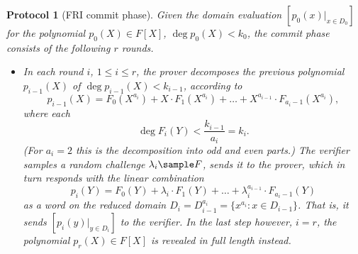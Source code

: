 \documentclass[11pt,article,oneside]{memoir}
\newtheorem{protocol}[]{Protocol}
\theoremstyle{definition}
\theoremstyle{remark}
\begin{document}
\begin{protocol}[FRI commit phase]
Given the domain evaluation $[p_0(x)|_{x\in D_0}]$ for the polynomial $p_0(X)\in F[X]$, $\deg p_0(X) < k_0$, the commit phase consists of the following $r$ rounds.
\begin{itemize}
\item
In each round $i$, $1\leq i\leq r$, the prover decomposes the previous polynomial $p_{i-1}(X)$ of $\deg p_{i-1}(X) < k_{i-1}$,  
according to
\begin{equation}
\label{e:FRIdecomposition}
p_{i-1}(X) = F_0(X^{a_i})+ X\cdot F_1(X^{a_i})+  \ldots +X^{a_{i-1}} \cdot F_{a_i-1}(X^{a_i}),
\end{equation}
where each 
\[
\deg F_i(Y) <  \frac{k_{i-1}}{a_i} = k_i.
\] 
(For $a_i=2$ this is the decomposition into odd and even parts.)
The verifier samples a random challenge $\lambda_i\sample F$, sends it to the prover, which in turn responds with the linear combination
\begin{equation*}
p_i(Y)=F_0(Y)+ \lambda_i \cdot F_1(Y)+  \ldots + \lambda_i^{a_{i-1}} \cdot F_{a_i-1}(Y)
\end{equation*}
as a word on the reduced domain $D_i= D_{i-1}^{a_i} =\{x^{a_i}: x\in D_{i-1}\}$. 
That is, it sends
$
[p_i(y)|_{y\in D_i}]
$ 
to the verifier. 
In the last step however, $i=r$, the polynomial 
$p_r(X)\in F[X]$
is revealed in full length instead.
\end{itemize}
\end{protocol}
\end{document}
